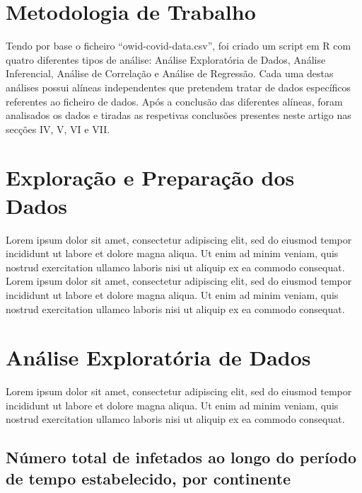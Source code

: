 \documentclass[conference]{IEEEtran}
\begin{document}
\section{Metodologia de Trabalho}
Tendo por base o ficheiro “owid-covid-data.csv”\cite{b2}, foi criado um script em R com quatro diferentes tipos de análise: Análise Exploratória de Dados, Análise Inferencial, Análise de Correlação e Análise de Regressão. Cada uma destas análises possui alíneas independentes que pretendem tratar de dados específicos referentes ao ficheiro de dados. Após a conclusão das diferentes alíneas, foram analisados os dados e tiradas as respetivas conclusões presentes neste artigo nas secções IV, V, VI e VII.

\section{Exploração e Preparação dos Dados}
Lorem ipsum dolor sit amet, consectetur adipiscing elit, sed do eiusmod tempor incididunt ut labore et dolore magna aliqua. Ut enim ad minim veniam, quis nostrud exercitation ullamco laboris nisi ut aliquip ex ea commodo consequat.
Lorem ipsum dolor sit amet, consectetur adipiscing elit, sed do eiusmod tempor incididunt ut labore et dolore magna aliqua. Ut enim ad minim veniam, quis nostrud exercitation ullamco laboris nisi ut aliquip ex ea commodo consequat.

\section{Análise Exploratória de Dados} %
Lorem ipsum dolor sit amet, consectetur adipiscing elit, sed do eiusmod tempor incididunt ut labore et dolore magna aliqua. Ut enim ad minim veniam, quis nostrud exercitation ullamco laboris nisi ut aliquip ex ea commodo consequat.

\subsection{Número total de infetados ao longo do período de tempo estabelecido, por continente}
\end{document}
